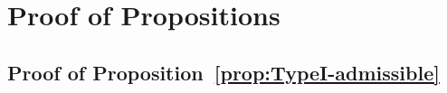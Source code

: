 \documentclass[letterpaper,11pt]{article}
\theoremstyle{definition}
\begin{document}
\appendix





 





\section{Proof of Propositions}

\subsection{Proof of Proposition~\ref{prop:TypeI-admissible}}\label{apd:proof-prop-admi-typeI}
\end{document}
